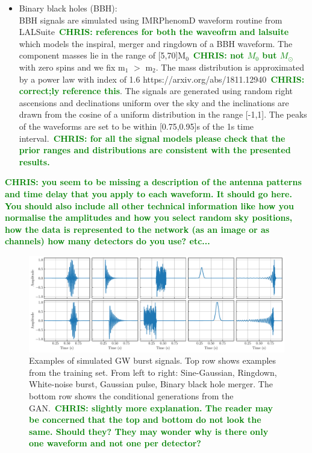 \documentclass[12pt]{iopart}
\newcommand{\chris}[1]{\textbf{\textcolor{green}{CHRIS: #1}}}
\begin{document}
\begin{itemize}
\item Binary black holes (BBH): \\
\ac{BBH} signals are simulated using IMRPhenomD waveform routine from
LALSuite~\chris{references for both the waveofrm and lalsuite} which models the
inspiral, merger and ringdown of a \ac{BBH} waveform. The component masses lie
in the range of [5,70]M$_0$~\chris{not $M_0$ but $M_{\odot}$} with zero spins
and we fix m$_1$ $>$ m$_2$. The mass distribution is approximated by a power
law with index of 1.6 https://arxiv.org/abs/1811.12940~\chris{correct;ly
reference this}. The signals are generated using random right ascensions and
declinations uniform over the sky and the inclinations are drawn from the
cosine of a uniform distribution in the range [-1,1]. The peaks of the
waveforms are set to be within [0.75,0.95]s of the 1s time interval.~\chris{for
all the signal models please check that the prior ranges and distributions are
consistent with the presented results.} 
%
\end{itemize}

\chris{you seem to be missing a description of the antenna patterns and time
delay that you apply to each waveform. It should go here. You should also
include all other technical information like how you normalise the amplitudes
and how you select random sky positions, how the data is represented to the
network (as an image or as channels) how many detectors do you use? etc... }

\begin{figure}
    \centering
    \includegraphics[width=\textwidth]{figures/train_gen.pdf}
    \caption{Examples of simulated \ac{GW} burst signals. Top row shows
examples from the training set. From left to right: Sine-Gaussian, Ringdown,
White-noise burst, Gaussian pulse, Binary black hole merger. The bottom row
shows the conditional generations from the GAN.~\chris{slightly more
explanation. The reader may be concerned that the top and bottom do not look
the same. Should they? They may wonder why is there only one waveform and not
one per detector?} } \label{fig:train} \end{figure}
\end{document}
